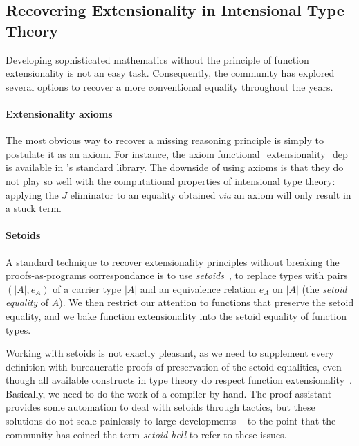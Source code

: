 \subsection{Recovering Extensionality in Intensional Type Theory}

Developing sophisticated mathematics without the principle of 
function extensionality is not an easy task.
Consequently, the community has explored several options to recover a more 
conventional equality throughout the years.

\paragraph*{Extensionality axioms}
% 
The most obvious way to recover a missing reasoning principle is simply to
postulate it as an axiom. 
% 
For instance, the axiom \textsf{functional\_extensionality\_dep} is available 
in \Coq's standard library.
% 
The downside of using axioms is that they do not play so well with the 
computational properties of intensional type theory:
% 
% 
applying the \( J \) eliminator to an equality obtained \textit{via} an axiom
will only result in a stuck term.

\paragraph*{Setoids}
% 
A standard technique to recover extensionality principles without breaking the
proofs-as-programs correspondance is to use \emph{setoids}~,
\ie to replace types with pairs \( (|A|, e_A) \) of a carrier type \( |A| \)
and an equivalence relation \( e_A \) on \( |A| \) 
(the \emph{setoid equality} of \( A \)).
% 
We then restrict our attention to functions that preserve the setoid equality, 
and we bake function extensionality into the setoid equality of function types.

Working with setoids is not exactly pleasant, as we need to supplement every
definition with bureaucratic proofs of preservation of the setoid equalities,
even though all available constructs in type theory do respect function 
extensionality~.
% 
Basically, we need to do the work of a compiler by hand.
% 
The \Coq proof assistant provides some automation to deal with setoids through 
tactics, but these solutions do not scale painlessly to large developments -- 
to the point that the community has coined the term \emph{setoid hell} to refer 
to these issues.


